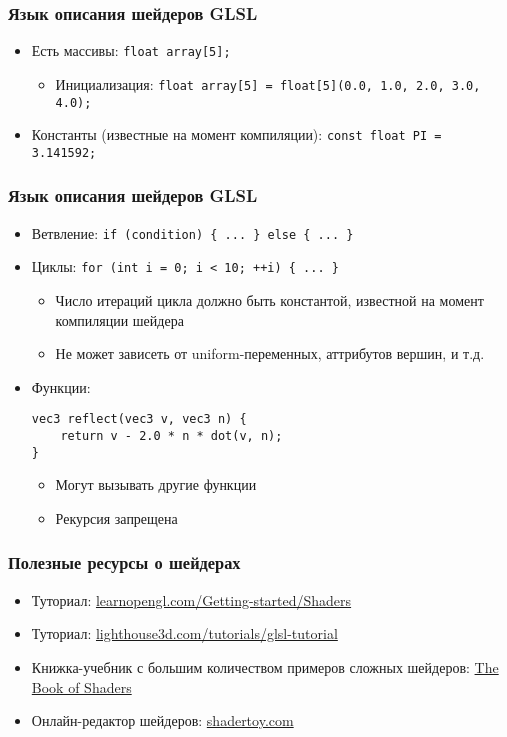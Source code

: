 \documentclass{beamer}
\begin{document}
\begin{frame}[fragile]
\frametitle{Язык описания шейдеров GLSL}
\begin{itemize}
\item Есть массивы: \verb|float array[5];|
\pause
\begin{itemize}
\item Инициализация: \verb|float array[5] = float[5](0.0, 1.0, 2.0, 3.0, 4.0);|
\end{itemize}
\pause
\item Константы (известные на момент компиляции): \verb|const float PI = 3.141592;|
\end{itemize}
\end{frame}

\begin{frame}[fragile]
\frametitle{Язык описания шейдеров GLSL}
\begin{itemize}
\item Ветвление: \verb|if (condition) { ... } else { ... }|
\pause
\item Циклы: \verb|for (int i = 0; i < 10; ++i) { ... }|
\begin{itemize}
\item Число итераций цикла должно быть константой, известной на момент компиляции шейдера
\item Не может зависеть от uniform-переменных, аттрибутов вершин, и т.д.
\end{itemize}
\pause
\item Функции: \begin{verbatim}vec3 reflect(vec3 v, vec3 n) {
    return v - 2.0 * n * dot(v, n);
}\end{verbatim}
\pause
\begin{itemize}
\item Могут вызывать другие функции
\pause
\item Рекурсия запрещена
\end{itemize}
\end{itemize}
\end{frame}

\begin{frame}[fragile]
\frametitle{Полезные ресурсы о шейдерах}
\begin{itemize}
\item Туториал: \href{https://learnopengl.com/Getting-started/Shaders}{learnopengl.com/Getting-started/Shaders}
\item Туториал: \href{https://www.lighthouse3d.com/tutorials/glsl-tutorial}{lighthouse3d.com/tutorials/glsl-tutorial}
\pause
\item Книжка-учебник с большим количеством примеров сложных шейдеров: \href{https://thebookofshaders.com/00/}{The Book of Shaders}
\pause
\item Онлайн-редактор шейдеров: \href{https://shadertoy.com/}{shadertoy.com}
\end{itemize}
\end{frame}
\end{document}
